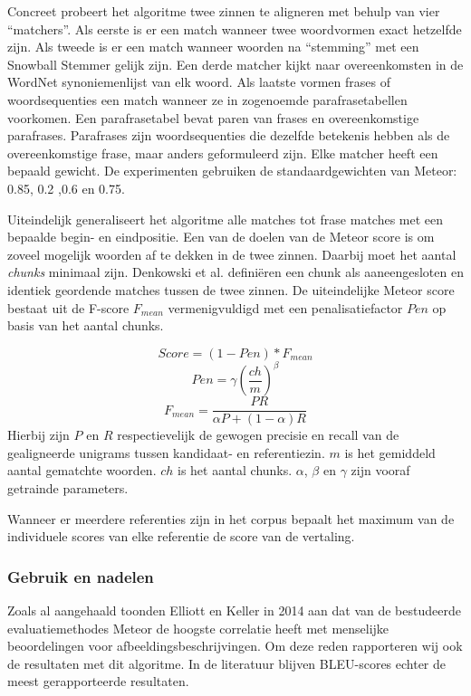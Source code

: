 Concreet probeert het algoritme twee zinnen te aligneren met behulp van vier ``matchers''. Als eerste is er een match wanneer twee woordvormen exact hetzelfde zijn. Als tweede is er een match wanneer woorden na ``stemming'' met een Snowball Stemmer\cite{porter2001snowball} gelijk zijn. Een derde matcher kijkt naar overeenkomsten in de WordNet synoniemenlijst van elk woord\cite{Miller1990}. Als laatste vormen frases of woordsequenties een match wanneer ze in zogenoemde parafrasetabellen voorkomen. Een parafrasetabel bevat paren van frases en overeenkomstige parafrases. Parafrases zijn woordsequenties die dezelfde betekenis hebben als de overeenkomstige frase, maar anders geformuleerd zijn.
Elke matcher heeft een bepaald gewicht. De experimenten gebruiken de standaardgewichten van Meteor: 0.85, 0.2 ,0.6 en 0.75.

Uiteindelijk generaliseert het algoritme alle matches tot frase matches met een bepaalde begin- en eindpositie. Een van de doelen van de Meteor score is om zoveel mogelijk woorden af te dekken in de twee zinnen. Daarbij moet het aantal \textit{chunks} minimaal zijn. Denkowski et al. defini\"eren een chunk als aaneengesloten en identiek geordende matches tussen de twee zinnen. De uiteindelijke Meteor score bestaat uit de F-score $F_{mean}$ vermenigvuldigd met een penalisatiefactor $Pen$ op basis van het aantal chunks.


\begin{equation}
Score = (1 - Pen)*F_{mean}
\end{equation} 
\begin{equation}
Pen = \gamma (\frac{ch}{m})^\beta 
\end{equation}
\begin{equation}
F_{mean} = \frac{PR}{\alpha P + (1- \alpha)R}
\end{equation}
Hierbij zijn $P$ en $R$ respectievelijk de gewogen precisie en recall van de gealigneerde unigrams tussen kandidaat- en referentiezin. $m$ is het gemiddeld aantal gematchte woorden. $ch$ is het aantal chunks. $\alpha$, $\beta$ en $\gamma$ zijn vooraf getrainde parameters.

Wanneer er meerdere referenties zijn in het corpus bepaalt het maximum van de individuele scores van elke referentie de score van de vertaling.

\subsubsection{Gebruik en nadelen}
Zoals al aangehaald toonden Elliott en Keller in 2014 aan dat van de bestudeerde evaluatiemethodes Meteor de hoogste correlatie heeft met menselijke beoordelingen voor afbeeldingsbeschrijvingen. Om deze reden rapporteren wij ook de resultaten met dit algoritme. In de literatuur blijven BLEU-scores echter de meest gerapporteerde resultaten.

